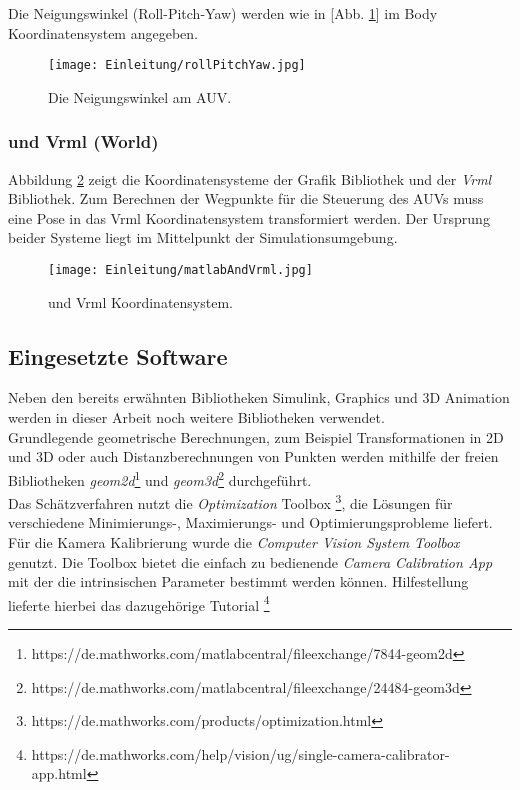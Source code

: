 Die Neigungswinkel (Roll-Pitch-Yaw) werden wie in [Abb. \ref{Abb. 2}] im Body Koordinatensystem angegeben.
\begin{figure}[H]
	\centering
	\texttt{[image: Einleitung/rollPitchYaw.jpg]}
	\caption{Die Neigungswinkel am AUV.}
	\label{Abb. 2}
\end{figure}
\subsubsection{\matlab und Vrml (World)}
Abbildung \ref{Abb. 3} zeigt die Koordinatensysteme der \matlab Grafik Bibliothek und der \textit{Vrml} Bibliothek. Zum Berechnen der Wegpunkte für die Steuerung des AUVs muss eine Pose in das Vrml Koordinatensystem transformiert werden. Der Ursprung beider Systeme liegt im Mittelpunkt der Simulationsumgebung.
\begin{figure}[H]
	\centering
	\texttt{[image: Einleitung/matlabAndVrml.jpg]}
	\caption{\matlab und Vrml Koordinatensystem.}
	\label{Abb. 3}
\end{figure}

\subsection{Eingesetzte Software}
Neben den bereits erwähnten \matlab Bibliotheken Simulink, Graphics und 3D Animation werden in dieser Arbeit noch weitere Bibliotheken verwendet.\\
Grundlegende geometrische Berechnungen, zum Beispiel Transformationen in 2D und 3D oder auch Distanzberechnungen von Punkten werden mithilfe der freien Bibliotheken \textit{geom2d}\footnote{https://de.mathworks.com/matlabcentral/fileexchange/7844-geom2d} und \textit{geom3d}\footnote{https://de.mathworks.com/matlabcentral/fileexchange/24484-geom3d} durchgeführt.\\
Das Schätzverfahren nutzt die \textit{Optimization} Toolbox \footnote{https://de.mathworks.com/products/optimization.html}, die Lösungen für verschiedene Minimierungs-, Maximierungs- und Optimierungsprobleme liefert.\\
Für die Kamera Kalibrierung wurde die \matlab \textit{Computer Vision System Toolbox} genutzt. Die Toolbox bietet die einfach zu bedienende \textit{Camera Calibration App} mit der die intrinsischen Parameter bestimmt werden können.
Hilfestellung lieferte hierbei das dazugehörige Tutorial \footnote{https://de.mathworks.com/help/vision/ug/single-camera-calibrator-app.html}\\